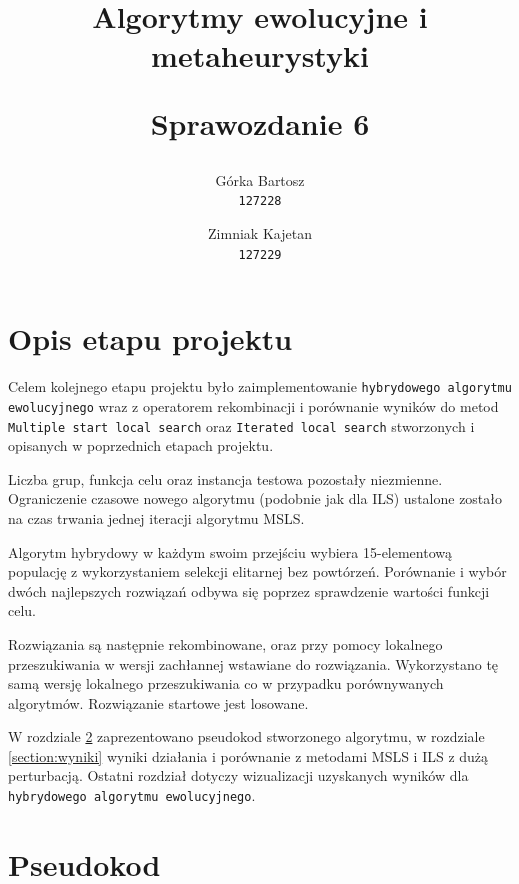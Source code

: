 \documentclass[main.tex]{subfiles}
\begin{document}
\title{
    \textbf{Algorytmy ewolucyjne i metaheurystyki}\\
    \begin{large}
        Sprawozdanie 6
    \end{large}
}

\author{
    Górka Bartosz\\
  \texttt{127228}
  \and
  Zimniak Kajetan\\
  \texttt{127229}
}

\date{}

\maketitle

\section{Opis etapu projektu}
Celem kolejnego etapu projektu było zaimplementowanie \texttt{hybrydowego algorytmu ewolucyjnego} wraz z operatorem rekombinacji i porównanie wyników do metod \texttt{Multiple start local search} oraz \texttt{Iterated local search} stworzonych i opisanych w poprzednich etapach projektu.

Liczba grup, funkcja celu oraz instancja testowa pozostały niezmienne.
Ograniczenie czasowe nowego algorytmu (podobnie jak dla ILS) ustalone zostało na czas trwania jednej iteracji algorytmu MSLS.

Algorytm hybrydowy w każdym swoim przejściu wybiera 15-elementową populację z wykorzystaniem selekcji elitarnej bez powtórzeń. Porównanie i wybór dwóch najlepszych rozwiązań odbywa się poprzez sprawdzenie wartości funkcji celu.

Rozwiązania są następnie rekombinowane, oraz przy pomocy lokalnego przeszukiwania w wersji zachłannej wstawiane do rozwiązania. Wykorzystano tę samą wersję lokalnego przeszukiwania co w przypadku porównywanych algorytmów. Rozwiązanie startowe jest losowane.

W rozdziale \ref{section:pseudokody} zaprezentowano pseudokod stworzonego algorytmu, w rozdziale \ref{section:wyniki} wyniki działania i porównanie z metodami MSLS i ILS z dużą perturbacją. Ostatni rozdział dotyczy wizualizacji uzyskanych wyników dla \texttt{hybrydowego algorytmu ewolucyjnego}.

\section{Pseudokod}
\label{section:pseudokody}
\end{document}
